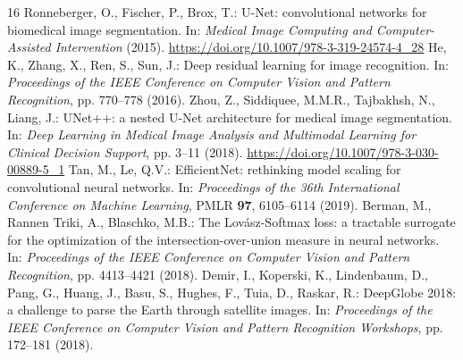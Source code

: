 \documentclass[10pt,a4paper,twocolumn]{article}
\begin{document}
\begin{thebibliography}{16}
 Ronneberger, O., Fischer, P., Brox, T.: U-Net: convolutional networks for biomedical image segmentation. In: \emph{Medical Image Computing and Computer-Assisted Intervention} (2015). \url{https://doi.org/10.1007/978-3-319-24574-4_28}
 He, K., Zhang, X., Ren, S., Sun, J.: Deep residual learning for image recognition. In: \emph{Proceedings of the IEEE Conference on Computer Vision and Pattern Recognition}, pp. 770--778 (2016).
 Zhou, Z., Siddiquee, M.M.R., Tajbakhsh, N., Liang, J.: UNet++: a nested U-Net architecture for medical image segmentation. In: \emph{Deep Learning in Medical Image Analysis and Multimodal Learning for Clinical Decision Support}, pp. 3--11 (2018). \url{https://doi.org/10.1007/978-3-030-00889-5_1}
 Tan, M., Le, Q.V.: EfficientNet: rethinking model scaling for convolutional neural networks. In: \emph{Proceedings of the 36th International Conference on Machine Learning}, PMLR \textbf{97}, 6105--6114 (2019).
 Berman, M., Rannen Triki, A., Blaschko, M.B.: The Lov\'{a}sz-Softmax loss: a tractable surrogate for the optimization of the intersection-over-union measure in neural networks. In: \emph{Proceedings of the IEEE Conference on Computer Vision and Pattern Recognition}, pp. 4413--4421 (2018).
 Demir, I., Koperski, K., Lindenbaum, D., Pang, G., Huang, J., Basu, S., Hughes, F., Tuia, D., Raskar, R.: DeepGlobe 2018: a challenge to parse the Earth through satellite images. In: \emph{Proceedings of the IEEE Conference on Computer Vision and Pattern Recognition Workshops}, pp. 172--181 (2018).
\end{thebibliography}
\end{document}
